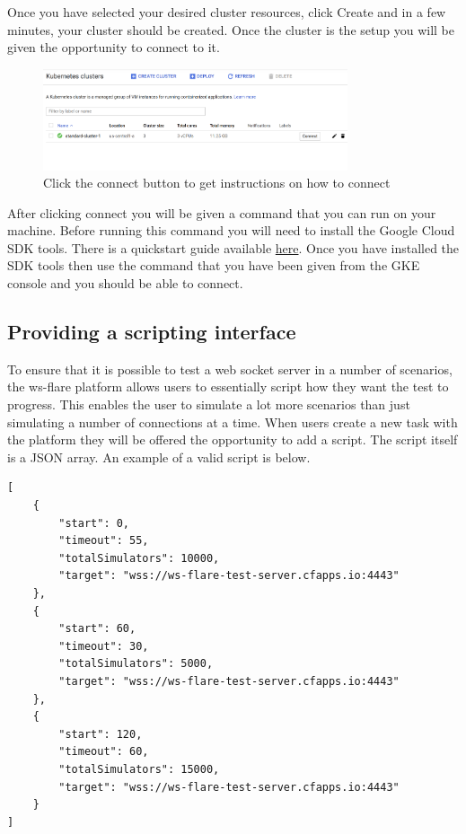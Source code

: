 \FloatBarrier

Once you have selected your desired cluster resources, click Create and in a few minutes, your cluster should be created. Once the cluster is the setup you will be given the opportunity to connect to it. 

\begin{figure}[!h]
  \centering
    \includegraphics[width=0.8\textwidth]{figures/gke-setup-3.png}
    \caption{Click the connect button to get instructions on how to connect}
    \label{fig:https-handshake}
\end{figure}

\FloatBarrier

After clicking connect you will be given a command that you can run on your machine. Before running this command you will need to install the Google Cloud SDK tools. There is a quickstart guide available
\href{https://cloud.google.com/sdk/docs/quickstart-linux}{here}. Once you have installed the SDK tools then use the command that you have been given from the GKE console and you should be able to connect.

\subsection{Providing a scripting interface}

To ensure that it is possible to test a web socket server in a number of scenarios, the ws-flare platform allows users to essentially script how they want the test to progress. This enables the user to simulate a lot more scenarios than just simulating a number of connections at a time. When users create a new task with the platform they will be offered the opportunity to add a script. The script itself is a JSON array. An example of a valid script is below.

\begin{verbatim}
[
    {
        "start": 0,
        "timeout": 55,
        "totalSimulators": 10000,
        "target": "wss://ws-flare-test-server.cfapps.io:4443"
    },
    {
        "start": 60,
        "timeout": 30,
        "totalSimulators": 5000,
        "target": "wss://ws-flare-test-server.cfapps.io:4443"
    },
    {
        "start": 120,
        "timeout": 60,
        "totalSimulators": 15000,
        "target": "wss://ws-flare-test-server.cfapps.io:4443"
    }
]
\end{verbatim}


